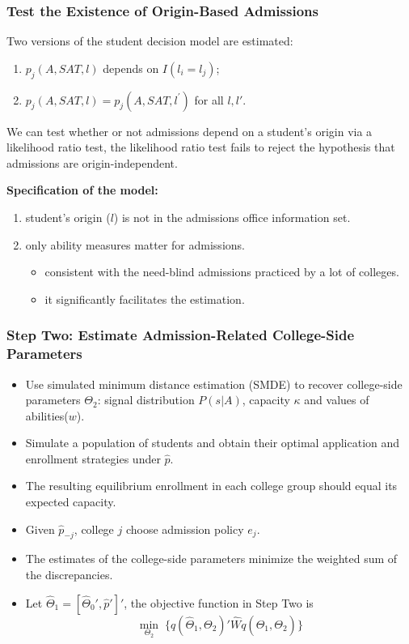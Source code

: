 \documentclass[10pt]{beamer}
\begin{document}
\begin{frame}[c]\frametitle{Test the Existence of Origin-Based Admissions}
Two versions of the student decision model are estimated:
\begin{enumerate}
    \item $p_{j}(A,SAT,l)$ depends on $I(l_{i}=l_{j})$;
    \item  $p_{j}(A,SAT,l)=p_{j}(A,SAT,l^{\prime})$ for all $l,l'$.
\end{enumerate}
We can test whether or not admissions depend on a student's origin via a likelihood ratio test, the likelihood ratio test fails to reject the hypothesis that \alert{admissions are origin-independent}.

\textbf{Specification of the model:}
\begin{enumerate}
    \item student's origin ($l$) is not in the admissions office information set.
    \item only ability measures matter for admissions.
    \begin{itemize}
        \item consistent with the need-blind admissions practiced by a lot of
colleges.
        \item  it significantly facilitates the estimation.
    \end{itemize}

\end{enumerate}

\end{frame}

\begin{frame}[c]\frametitle{Step Two: Estimate Admission-Related College-Side Parameters}
\begin{itemize}
    \item Use \alert{simulated minimum distance estimation (SMDE)} to recover college-side parameters $\Theta_{2}$: signal distribution $P(s|A)$, capacity $\kappa$ and values of abilities($w$).
    \item  Simulate a population of students and obtain their optimal application and enrollment strategies under $\hat{p}$.
    \item The resulting equilibrium enrollment in each college group should equal its expected capacity.
    \item Given $\hat{p}_{-j}$, college $j$ choose admission policy $e_{j}$.
    \item The estimates of the college-side parameters minimize the weighted sum of the discrepancies.
    \item Let $\widehat{\Theta}_{1}=[\widehat{\Theta}_{0}',\hat{p}']'$, the objective function in Step Two is
    \begin{equation}
        \min_{\Theta_{2}}\; \big\{q(\widehat{\Theta}_{1},\Theta_{2})'\widehat{W}q(\widehat{\Theta}_{1},\Theta_{2})\big\}
    \end{equation}
\end{itemize}

\end{frame}
\end{document}
